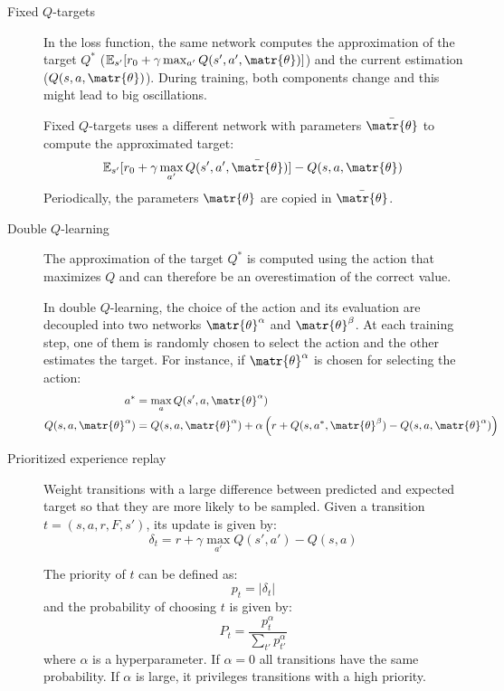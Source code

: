 \begin{description}
    \item[Fixed $Q$-targets] 
        In the loss function, the same network computes the approximation of the target $Q^*$ ($\mathbb{E}_{s'}[r_0 + \gamma \max_{a'} Q(s', a', \matr{\theta})]$) and the current estimation ($Q(s, a, \matr{\theta})$).
        During training, both components change and this might lead to big oscillations.

        Fixed $Q$-targets uses a different network with parameters $\bar{\matr{\theta}}$ to compute the approximated target:
        \[ \mathbb{E}_{s'}[r_0 + \gamma \max_{a'} Q(s', a', \bar{\matr{\theta}})] - Q(s, a, \matr{\theta}) \]
        Periodically, the parameters $\matr{\theta}$ are copied in $\bar{\matr{\theta}}$.

    
    \item[Double $Q$-learning] 
        The approximation of the target $Q^*$ is computed using the action that maximizes $Q$ and can therefore be an overestimation of the correct value.

        In double $Q$-learning, the choice of the action and its evaluation are decoupled into two networks $\matr{\theta}^\alpha$ and $\matr{\theta}^\beta$. At each training step, one of them is randomly chosen to select the action and the other estimates the target. For instance, if $\matr{\theta}^\alpha$ is chosen for selecting the action:
        \[
            \begin{split}
                a^* &= \max_a Q(s', a, \matr{\theta}^\alpha) \\
                Q(s, a, \matr{\theta}^\alpha) &= Q(s, a, \matr{\theta}^\alpha) + \alpha \left( r + Q(s, a^*, \matr{\theta}^\beta) - Q(s, a, \matr{\theta}^\alpha) \right) 
            \end{split}
        \]

    \item[Prioritized experience replay] 
        Weight transitions with a large difference between predicted and expected target so that they are more likely to be sampled.
        Given a transition $t = (s, a, r, F, s')$, its update is given by:
        \[ \delta_t = r + \gamma \max_{a'} Q(s', a') - Q(s, a) \]
        
        The priority of $t$ can be defined as:
        \[ p_t = \vert \delta_t \vert \]
        and the probability of choosing $t$ is given by:
        \[ P_t = \frac{p_t^\alpha}{\sum_{t'} p_{t'}^\alpha} \]
        where $\alpha$ is a hyperparameter. If $\alpha=0$ all transitions have the same probability. If $\alpha$ is large, it privileges transitions with a high priority.


\end{description}
